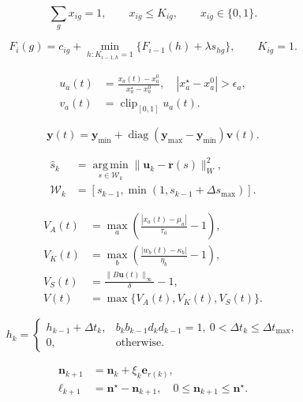 \begin{equation}
\sum_gx_{ig}=1,\qquad x_{ig}\leq K_{ig},\qquad x_{ig}\in\{0,1\}.
\label{eq:feas}
\end{equation}

\begin{equation}
F_i(g)=c_{ig}+\min_{h:K_{i-1,h}=1}\{F_{i-1}(h)+\lambda s_{hg}\},\qquad K_{ig}=1.
\label{eq:dp}
\end{equation}

\begin{equation}
\begin{aligned}u_a(t)&=\frac{x_a(t)-x_a^0}{x_a^\star-x_a^0},\quad |x_a^\star-x_a^0|>\epsilon_a,\\v_a(t)&=\operatorname{clip}_{[0,1]}u_a(t).\end{aligned}
\label{eq:norm}
\end{equation}

\begin{equation}
\mathbf y(t)=\mathbf y_{\min}+\operatorname{diag}(\mathbf y_{\max}-\mathbf y_{\min})\mathbf v(t).
\label{eq:display}
\end{equation}

\begin{equation}
\begin{aligned}\hat s_k&=\operatorname*{arg\,min}_{s\in\mathcal W_k}\|\mathbf u_k-\mathbf r(s)\|_W^2,\\\mathcal W_k&=[s_{k-1},\min(1,s_{k-1}+\Delta s_{\max})].\end{aligned}
\label{eq:path}
\end{equation}

\begin{equation}
\begin{aligned}V_A(t)&=\max_a\left(\frac{|x_a(t)-\mu_a|}{\tau_a}-1\right),\\V_K(t)&=\max_b\left(\frac{|w_b(t)-\kappa_b|}{\eta_b}-1\right),\\V_S(t)&=\frac{\|B\mathbf u(t)\|_\infty}{\delta}-1,\\V(t)&=\max\{V_A(t),V_K(t),V_S(t)\}.\end{aligned}
\label{eq:violation}
\end{equation}

\begin{equation}
h_k=\begin{cases}h_{k-1}+\Delta t_k,&b_kb_{k-1}d_kd_{k-1}=1,\ 0<\Delta t_k\leq\Delta t_{\max},\\0,&\text{otherwise}.\end{cases}
\label{eq:hold}
\end{equation}

\begin{equation}
\begin{aligned}\mathbf n_{k+1}&=\mathbf n_k+\xi_k\mathbf e_{r(k)},\\\boldsymbol\ell_{k+1}&=\mathbf n^\star-\mathbf n_{k+1},\quad 0\leq\mathbf n_{k+1}\leq\mathbf n^\star.\end{aligned}
\label{eq:ledger}
\end{equation}
